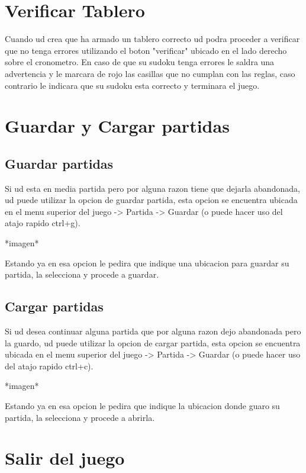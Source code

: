 \documentclass[11pt,fleqn]{book} %
\begin{document}
\section{Verificar Tablero}

Cuando ud crea que ha armado un tablero correcto ud podra proceder a verificar que no tenga errores utilizando el boton "verificar" ubicado en el lado derecho sobre el cronometro.
En caso de que su sudoku tenga errores le saldra una advertencia y le marcara de rojo las casillas que no cumplan con las reglas, caso contrario le indicara que su sudoku esta correcto y terminara el juego.

\section{Guardar y Cargar partidas}

\subsection{Guardar partidas}

Si ud esta en media partida pero por alguna razon tiene que dejarla abandonada, ud puede utilizar la opcion de guardar partida, esta opcion se encuentra ubicada en el menu superior del juego -> Partida -> Guardar (o puede hacer uso del atajo rapido ctrl+g).

*imagen*

Estando ya en esa opcion le pedira que indique una ubicacion para guardar su partida, la selecciona y procede a guardar.

\subsection{Cargar partidas}

Si ud desea continuar alguna partida que por alguna razon dejo abandonada pero la guardo, ud puede utilizar la opcion de cargar partida, esta opcion se encuentra ubicada en el menu superior del juego -> Partida -> Guardar (o puede hacer uso del atajo rapido ctrl+c).

*imagen*

Estando ya en esa opcion le pedira que indique la ubicacion donde guaro su partida, la selecciona y procede a abrirla.

\section{Salir del juego}
\end{document}
